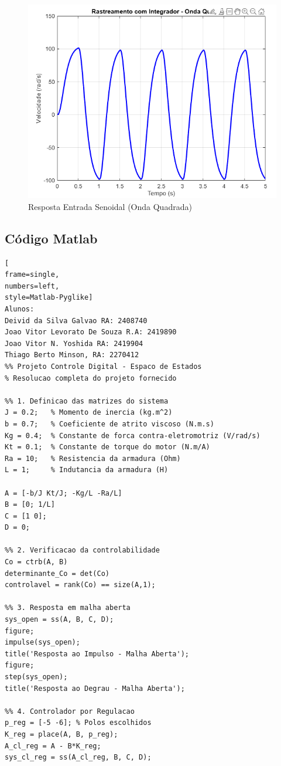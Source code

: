 \documentclass[a4paper, 12pt]{article}
\begin{document}
\begin{itemize}
\begin{figure}[H]
    \centering
    \includegraphics[width=0.75\linewidth]{SenoideRastreio.png}
    \caption{Resposta Entrada Senoidal (Onda Quadrada)}
    \label{fig:enter-label}
\end{figure}
   
\subsection{Código Matlab}

\begin{lstlisting}[
frame=single,
numbers=left,
style=Matlab-Pyglike]
Alunos:
Deivid da Silva Galvao RA: 2408740
Joao Vitor Levorato De Souza R.A: 2419890
Joao Vitor N. Yoshida RA: 2419904
Thiago Berto Minson, RA: 2270412
%% Projeto Controle Digital - Espaco de Estados
% Resolucao completa do projeto fornecido

%% 1. Definicao das matrizes do sistema
J = 0.2;   % Momento de inercia (kg.m^2)
b = 0.7;   % Coeficiente de atrito viscoso (N.m.s)
Kg = 0.4;  % Constante de forca contra-eletromotriz (V/rad/s)
Kt = 0.1;  % Constante de torque do motor (N.m/A)
Ra = 10;   % Resistencia da armadura (Ohm)
L = 1;     % Indutancia da armadura (H)

A = [-b/J Kt/J; -Kg/L -Ra/L]
B = [0; 1/L]
C = [1 0];
D = 0;

%% 2. Verificacao da controlabilidade
Co = ctrb(A, B)
determinante_Co = det(Co)
controlavel = rank(Co) == size(A,1);

%% 3. Resposta em malha aberta
sys_open = ss(A, B, C, D);
figure;
impulse(sys_open);
title('Resposta ao Impulso - Malha Aberta');
figure;
step(sys_open);
title('Resposta ao Degrau - Malha Aberta');

%% 4. Controlador por Regulacao
p_reg = [-5 -6]; % Polos escolhidos
K_reg = place(A, B, p_reg);
A_cl_reg = A - B*K_reg;
sys_cl_reg = ss(A_cl_reg, B, C, D);


\end{lstlisting}
\end{itemize}
\end{document}
